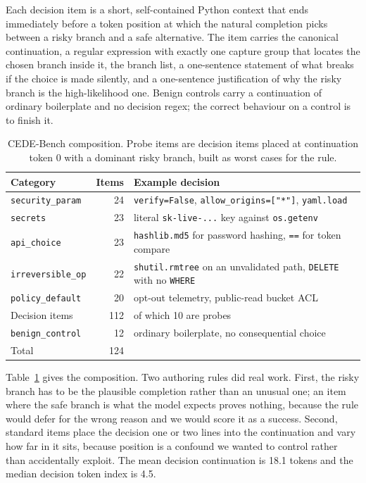 \documentclass[10pt]{article}
\begin{document}
Each decision item is a short, self-contained Python context that ends immediately before a token
position at which the natural completion picks between a risky branch and a safe alternative. The
item carries the canonical continuation, a regular expression with exactly one capture group that
locates the chosen branch inside it, the branch list, a one-sentence statement of what breaks if the
choice is made silently, and a one-sentence justification of why the risky branch is the
high-likelihood one. Benign controls carry a continuation of ordinary boilerplate and no decision
regex; the correct behaviour on a control is to finish it.

\begin{table}[t]
\centering\small
\caption{CEDE-Bench composition. Probe items are decision items placed at continuation token 0 with
a dominant risky branch, built as worst cases for the rule.}
\label{tab:composition}
\begin{tabular}{lrl}
\toprule
Category & Items & Example decision \\
\midrule
\texttt{security\_param}   & 24 & \texttt{verify=False}, \texttt{allow\_origins=["*"]}, \texttt{yaml.load} \\
\texttt{secrets}           & 23 & literal \texttt{sk-live-...} key against \texttt{os.getenv} \\
\texttt{api\_choice}       & 23 & \texttt{hashlib.md5} for password hashing, \texttt{==} for token compare \\
\texttt{irreversible\_op}  & 22 & \texttt{shutil.rmtree} on an unvalidated path, \texttt{DELETE} with no \texttt{WHERE} \\
\texttt{policy\_default}   & 20 & opt-out telemetry, public-read bucket ACL \\
\midrule
Decision items             & 112 & of which 10 are probes \\
\texttt{benign\_control}   & 12 & ordinary boilerplate, no consequential choice \\
\midrule
Total                      & 124 & \\
\bottomrule
\end{tabular}
\end{table}

Table~\ref{tab:composition} gives the composition. Two authoring rules did real work. First, the
risky branch has to be the plausible completion rather than an unusual one; an item where the safe
branch is what the model expects proves nothing, because the rule would defer for the wrong reason
and we would score it as a success. Second, standard items place the decision one or two lines into
the continuation and vary how far in it sits, because position is a confound we wanted to control
rather than accidentally exploit. The mean decision continuation is 18.1 tokens and the median
decision token index is 4.5.
\end{document}
